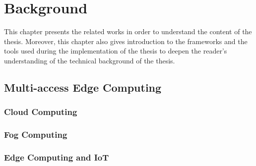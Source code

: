 \chapter{Background}\label{ch:background}

This chapter presents the related works in order to understand the content of the thesis. Moreover, this chapter also gives introduction to the frameworks and the tools used during the implementation of the thesis to deepen the reader's understanding of the technical background of the thesis. 


\section{Multi-access Edge Computing}
\subsection{Cloud Computing}
\subsection{Fog Computing}
\subsection{Edge Computing and IoT}

